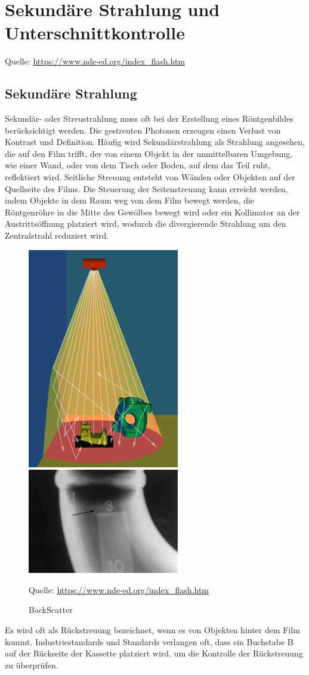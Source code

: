 \label{sec:RT Technik}
\section{Sekundäre Strahlung und Unterschnittkontrolle}
\label{sec:Strahlung und Unterschnittkontrolle}
Quelle: \url{https://www.nde-ed.org/index_flash.htm}
\subsection{Sekundäre Strahlung}
Sekundär- oder Streustrahlung muss oft bei der Erstellung eines Röntgenbildes berücksichtigt werden. Die gestreuten Photonen erzeugen einen Verlust von Kontrast und Definition. Häufig wird Sekundärstrahlung als Strahlung angesehen, die auf den Film trifft, der von einem Objekt in der unmittelbaren Umgebung, wie einer Wand, oder von dem Tisch oder Boden, auf dem das Teil ruht, reflektiert wird. Seitliche Streuung entsteht von Wänden oder Objekten auf der Quellseite des Films. Die Steuerung der Seitenstreuung kann erreicht werden, indem Objekte in dem Raum weg von dem Film bewegt werden, die Röntgenröhre in die Mitte des Gewölbes bewegt wird oder ein Kollimator an der Austrittsöffnung platziert wird, wodurch die divergierende Strahlung um den Zentralstrahl reduziert wird.
\begin{figure}[htb]
 \includegraphics[scale=0.7]{img/XRSIM-Scatter2aS.jpg}
 \includegraphics[scale=0.9]{img/BackScatter(small).jpg}
 \caption{BackScatter}
 Quelle: \url{https://www.nde-ed.org/index_flash.htm}
  \label{fig:BackScatter}
\end{figure}
Es wird oft als Rückstreuung bezeichnet, wenn es von Objekten hinter dem Film kommt. Industriestandards und Standards verlangen oft, dass ein Buchstabe B auf der Rückseite der Kassette platziert wird, um die Kontrolle der Rückstreuung zu überprüfen.

